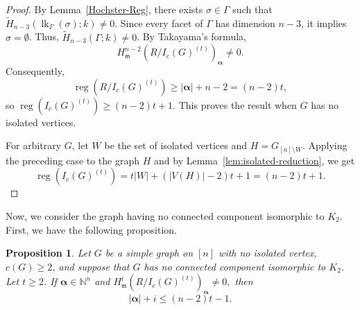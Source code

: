 \documentclass[12pt]{amsart}
\newtheorem{proposition}{Proposition}[section]
\DeclareMathOperator{\reg}{reg}
\DeclareMathOperator{\lk}{lk}
\begin{document}
\begin{proof}
By Lemma~\ref{Hochster-Reg}, there exists $\sigma\in\Gamma$ such that $\widetilde H_{n-3}(\lk_\Gamma(\sigma);k)\ne0$. Since every facet of $\Gamma$ has dimension $n-3$, it implies $\sigma=\emptyset$. Thus, $\widetilde H_{n-3}(\Gamma;k)\ne0$. By Takayama's formula,
\[
H_{\mathfrak m}^{n-2}(R/I_c(G)^{(t)})_{\boldsymbol\alpha}\ne0.
\]
Consequently,
\[
\reg(R/I_c(G)^{(t)})\ge|\boldsymbol\alpha|+n-2=(n-2)t,
\]
so $\reg(I_c(G)^{(t)})\ge(n-2)t+1$. This proves the result when $G$ has no isolated vertices.

For arbitrary $G$, let  $W$ be the set of isolated vertices and $H=G_{[n]\setminus W}$. Applying the preceding case to the graph $H$ and by Lemma~\ref{lem:isolated-reduction}, we get
\[
\reg(I_c(G)^{(t)})=t|W|+(|V(H)|-2)t+1=(n-2)t+1.
\]
\end{proof}

Now, we consider the graph having no connected component isomorphic to \(K_2\). First, we have the following proposition.

\begin{proposition} \label{prop:nonnegative-degrees}
Let $G$ be a simple graph on $[n]$ with no isolated vertex, $c(G)\ge2$, and suppose that $G$ has no connected component isomorphic to $K_2$. Let $t\ge2$. If $\boldsymbol{\alpha}\in\mathbb N^n$ and $H_{\mathfrak m}^i(R/I_c(G)^{(t)})_{\boldsymbol{\alpha}}\neq0,$ then
\[
|\boldsymbol{\alpha}|+i\le(n-2)t-1.
\]
\end{proposition}
\end{document}
